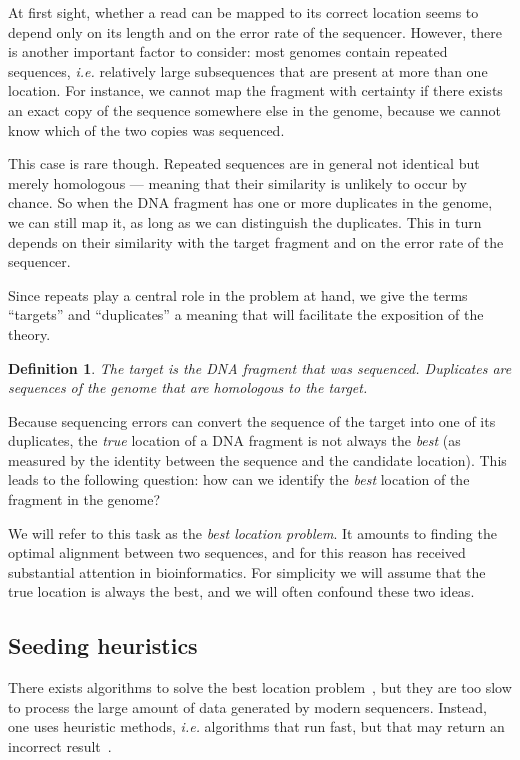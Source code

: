 \documentclass{article}
\newtheorem{definition}{Definition}
\begin{document}
At first sight, whether a read can be mapped to its correct location seems
to depend only on its length and on the error rate of the sequencer.
However, there is another important factor to consider: most genomes
contain repeated sequences, \textit{i.e.} relatively large subsequences
that are present at more than one location. For instance, we cannot map
the fragment with certainty if there exists an exact copy of the sequence
somewhere else in the genome, because we cannot know which of the two
copies was sequenced.

This case is rare though. Repeated sequences are in general not identical
but merely homologous --- meaning that their similarity is unlikely to
occur by chance. So when the DNA fragment has one or more duplicates in
the genome, we can still map it, as long as we can distinguish the
duplicates. This in turn depends on their similarity with the target
fragment and on the error rate of the sequencer.

Since repeats play a central role in the problem at hand, we give the
terms ``targets'' and ``duplicates'' a meaning that will facilitate the
exposition of the theory.

\begin{definition}
The target is the DNA fragment that was sequenced. Duplicates are
sequences of the genome that are homologous to the target.
\end{definition}

Because sequencing errors can convert the sequence of the target into one
of its duplicates, the \emph{true} location of a DNA fragment is not
always the \emph{best} (as measured by the identity between the sequence
and the candidate location). This leads to the following question: how can
we identify the \emph{best} location of the fragment in the genome? 

We will refer to this task as the \emph{best location problem}. It amounts
to finding the optimal alignment between two sequences, and for this
reason has received substantial attention in bioinformatics. For
simplicity we will assume that the true location is always the best, and
we will often confound these two ideas.

\subsection{Seeding heuristics}
\label{sec:seedheur}

There exists algorithms to solve the best location
problem~\cite{pmid7265238,pmid5420325}, but they are too slow to process
the large amount of data generated by modern sequencers. Instead, one uses
heuristic methods, \textit{i.e.} algorithms that run fast, but that may
return an incorrect result~\cite{Waterman1984}.
\end{document}
